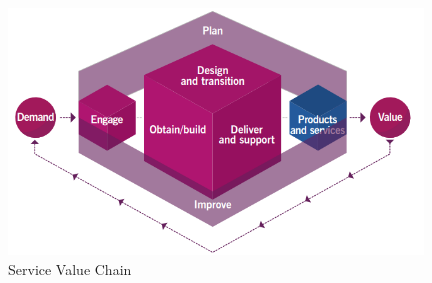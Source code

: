 \documentclass[
  digital,     %
  twoside,     %
  lof,         %
  lot,         %
]{fithesis4}
\begin{document}
\begin{compactitem}
    \begin{figure}[h]
        \begin{center}
            \includegraphics[width=11cm]{img/value_chain.png}
        \end{center}
        \caption{Service Value Chain \parencite[s.~21]{Cartlidge2020}}
        \label{fig:value_chain}
    \end{figure} 
    

\end{compactitem}
\end{document}
